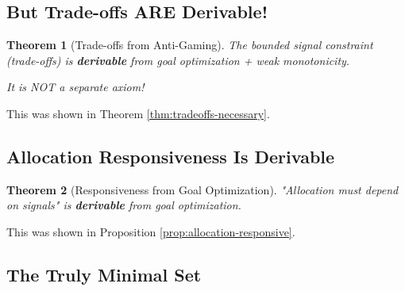 \documentclass[11pt,a4paper]{article}
\newtheorem{theorem}{Theorem}[section]
\theoremstyle{definition}
\theoremstyle{remark}
\begin{document}
\subsection{But Trade-offs ARE Derivable!}

\begin{theorem}[Trade-offs from Anti-Gaming]
The bounded signal constraint (trade-offs) is \textbf{derivable} from goal optimization + weak monotonicity.

It is NOT a separate axiom!
\end{theorem}

This was shown in Theorem \ref{thm:tradeoffs-necessary}.

\subsection{Allocation Responsiveness Is Derivable}

\begin{theorem}[Responsiveness from Goal Optimization]
"Allocation must depend on signals" is \textbf{derivable} from goal optimization.
\end{theorem}

This was shown in Proposition \ref{prop:allocation-responsive}.

\subsection{The Truly Minimal Set}

\begin{center}
\end{center}
\end{document}
